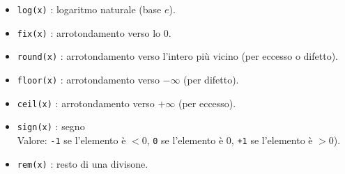 \begin{itemize}
	\item	\texttt{log(x)} : logaritmo naturale (base $e$).
	
	\item	\texttt{fix(x)} : arrotondamento verso lo 0.
	
	\item	\texttt{round(x)} : arrotondamento verso l'intero più vicino (per eccesso o difetto).
	
	\item	\texttt{floor(x)} : arrotondamento verso $-\infty$ (per difetto).
	
	\item	\texttt{ceil(x)} : arrotondamento verso $+\infty$ (per eccesso).
	
	\item	\texttt{sign(x)} : segno \\ 
	Valore: \texttt{-1} se l'elemento è $< 0$,  \texttt{0} se l'elemento è $0$,  \texttt{+1} se l'elemento è $> 
	0$).
	
	\item	\texttt{rem(x)} : resto di una divisone.

\end{itemize}